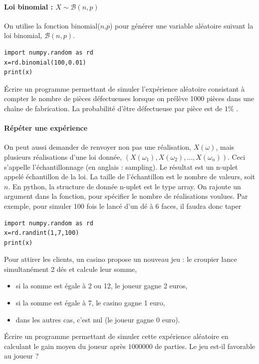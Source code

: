 \documentclass{book}
\begin{document}
\paragraph{Loi binomial : $X\sim\mathcal{B}(n, p)$}
On utilise la fonction binomial($n$,$p$) pour générer une variable aléatoire suivant la loi binomial, $\mathcal{B}(n, p)$.
\begin{lstlisting}
import numpy.random as rd
x=rd.binomial(100,0.01)
print(x)
\end{lstlisting}
\begin{Exercice}
Écrire un programme permettant de simuler l'expérience aléatoire consistant à compter le nombre de pièces défectueuses  lorsque on prélève 1000 pièces dans une chaîne de fabrication. La probabilité d'être défectueuse par pièce est de $1\%$ .    
\end{Exercice}

\paragraph{Répéter une expérience}
On peut aussi demander de renvoyer non pas une réalisation, $X(\omega)$, mais plusieurs réalisations d'une
loi donnée, $(X(\omega_1),X(\omega_2),\dots,X(\omega_n))$. Ceci s'appelle l'échantillonnage (en anglais :
sampling). Le résultat est un n-uplet appelé échantillon de la loi. La taille de l'échantillon est le nombre de valeurs, soit $n$. En python, la structure de donnée n-uplet est le type
array. On rajoute un argument dans la fonction, pour
spécifier le nombre de réalisations voulues. Par exemple, pour simuler 100 fois le lancé d'un dé à 6 faces, il faudra donc taper
\begin{lstlisting}
import numpy.random as rd
x=rd.randint(1,7,100)
print(x)
\end{lstlisting}
\begin{Exercice}
Pour attirer les clients, un casino propose un nouveau jeu : le croupier lance simultanément 2 dés et calcule leur somme,
\begin{itemize} 
\item si la somme est égale à 2 ou 12, le joueur gagne 2 euros,
\item si la somme est égale à 7, le casino gagne 1 euro,
\item dans les autres cas, c'est nul (le joueur gagne 0 euro).  
\end{itemize}
Écrire un programme permettant de simuler cette expérience aléatoire en calculant le gain moyen du joueur après $1 000 000$ de parties. Le jeu est-il favorable au joueur ?
\end{Exercice}
\end{document}
